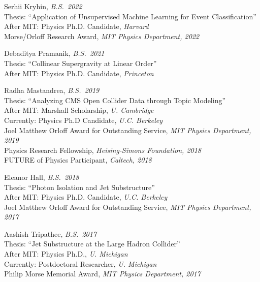 \bbl

\item Serhii Kryhin, \emph{B.S.~2022}
\\ \sh Thesis: ``Application of Unsupervised Machine Learning for Event Classification''
\\ \sh After MIT: Physics Ph.D. Candidate, \emph{Harvard}
\\ \sh Morse/Orloff Research Award, \emph{MIT Physics Department, 2022}

\item Debaditya Pramanik, \emph{B.S.~2021}
\\ \sh Thesis: ``Collinear Supergravity at Linear Order''
\\ \sh After MIT: Physics Ph.D. Candidate, \emph{Princeton}

\item Radha Mastandrea, \emph{B.S.~2019}
\\ \sh Thesis: ``Analyzing CMS Open Collider Data through Topic Modeling''
\\ \sh After MIT: Marshall Scholarship, \emph{U. Cambridge}
\\ \sh Currently: Physics Ph.D Candidate, \emph{U.C. Berkeley}
\\ \sh Joel Matthew Orloff Award for Outstanding Service, \emph{MIT Physics Department, 2019}
\\ \sh Physics Research Fellowship, \emph{Heising-Simons Foundation, 2018}
\\ \sh FUTURE of Physics Participant, \emph{Caltech, 2018}

\item Eleanor Hall, \emph{B.S.~2018}
\\ \sh Thesis: ``Photon Isolation and Jet Substructure''
\\ \sh After MIT: Physics Ph.D. Candidate, \emph{U.C. Berkeley}
\\ \sh Joel Matthew Orloff Award for Outstanding Service, \emph{MIT Physics Department, 2017}

\item Aashish Tripathee, \emph{B.S.~2017}
\\ \sh Thesis: ``Jet Substructure at the Large Hadron Collider''
\\ \sh After MIT: Physics Ph.D., \emph{U. Michigan}
\\ \sh Currently: Postdoctoral Researcher, \emph{U. Michigan}
\\ \sh Philip Morse Memorial Award, \emph{MIT Physics Department, 2017}

